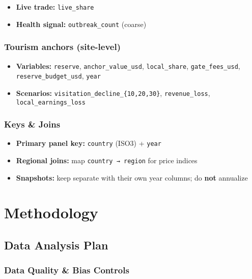 \documentclass[
]{article}
\providecommand{\tightlist}{%
  \setlength{\itemsep}{0pt}\setlength{\parskip}{0pt}}
\begin{document}
\begin{itemize}
\tightlist
\item
  \textbf{Live trade:} \texttt{live\_share}
\item
  \textbf{Health signal:} \texttt{outbreak\_count} (coarse)
\end{itemize}

\subsubsection{Tourism anchors
(site-level)}\label{tourism-anchors-site-level}

\begin{itemize}
\tightlist
\item
  \textbf{Variables:} \texttt{reserve}, \texttt{anchor\_value\_usd},
  \texttt{local\_share}, \texttt{gate\_fees\_usd},
  \texttt{reserve\_budget\_usd}, \texttt{year}
\item
  \textbf{Scenarios:} \texttt{visitation\_decline\_\{10,20,30\}},
  \texttt{revenue\_loss}, \texttt{local\_earnings\_loss}
\end{itemize}

\subsubsection{Keys \& Joins}\label{keys-joins}

\begin{itemize}
\tightlist
\item
  \textbf{Primary panel key:} \texttt{country} (ISO3) + \texttt{year}
\item
  \textbf{Regional joins:} map \texttt{country\ →\ region} for price
  indices
\item
  \textbf{Snapshots:} keep separate with their own year columns; do
  \textbf{not} annualize
\end{itemize}

\section{Methodology}\label{methodology}

\subsection{Data Analysis Plan}\label{data-analysis-plan}

\subsubsection{Data Quality \& Bias
Controls}\label{data-quality-bias-controls}
\end{document}
